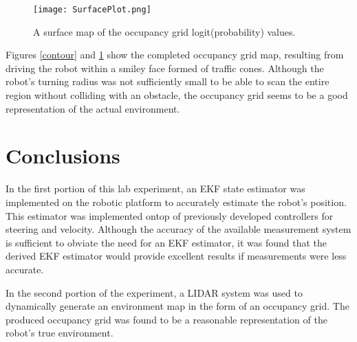 \documentclass[11pt]{article} %
\begin{document}
\begin{figure}[hbt]
 \centering
 \texttt{[image: SurfacePlot.png]}
 \caption{A surface map of the occupancy grid logit(probability) values.}
 \label{surface}
\end{figure}

Figures \ref{contour} and \ref{surface} show the completed occupancy grid map, resulting from driving the robot within a smiley face formed of traffic cones.  Although the robot's turning radius was not sufficiently small to be able to scan the entire region without colliding with an obstacle, the occupancy grid seems to be a good representation of the actual environment.

\clearpage

\section{Conclusions}

In the first portion of this lab experiment, an EKF state estimator was implemented on the robotic platform to accurately estimate the robot's position. This estimator was implemented ontop of previously developed controllers for steering and velocity.  Although the accuracy of the available measurement system is sufficient to obviate the need for an EKF estimator, it was found that the derived EKF estimator would provide excellent results if measurements were less accurate.

In the second portion of the experiment, a LIDAR system was used to dynamically generate an environment map in the form of an occupancy grid.  The produced occupancy grid was found to be a reasonable representation of the robot's true environment.
\end{document}
